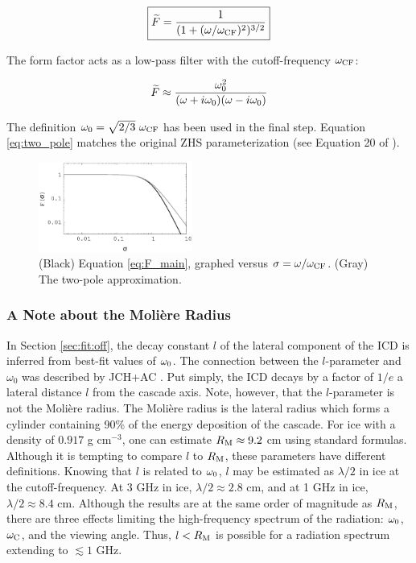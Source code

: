 \documentclass[amsmath,amssymb,aps,prd,10pt,twocolumn]{revtex4}
\begin{document}
\begin{equation}
\boxed{
\widetilde{F} = \frac{1}{(1+(\omega/\omega_{\rm CF})^2)^{3/2}}
} \label{eq:F_main}
\end{equation}

The form factor acts as a low-pass filter with the cutoff-frequency $\omega_{\rm CF}$:

\begin{equation}
\widetilde{F} \approx \frac{\omega_{\rm 0}^2}{(\omega+i\omega_{\rm 0})(\omega-i\omega_{\rm 0})} \label{eq:two_pole}
\end{equation}

The definition $\omega_{\rm 0} = \sqrt{2/3} ~ \omega_{\rm CF}$ has been used in the final step.  Equation \ref{eq:two_pole} matches the original ZHS parameterization (see Equation 20 of \cite{zhs}).

\begin{figure}
\centering
\includegraphics[width=0.45\textwidth]{April23_plot1.eps}
\caption{\label{fig:F}  (Black) Equation \ref{eq:F_main}, graphed versus $\sigma = \omega/\omega_{\rm CF}$. (Gray) The two-pole approximation.}
\end{figure}

\subsubsection{A Note about the Moli\`{e}re Radius}

In Section \ref{sec:fit:off}, the decay constant $l$ of the lateral component of the ICD is inferred from best-fit values of $\omega_{\rm 0}$.  The connection between the $l$-parameter and $\omega_0$ was described by JCH+AC \cite{10.1016/j.astropartphys.2017.03.008}.  Put simply, the ICD decays by a factor of $1/e$ a lateral distance $l$ from the cascade axis.  Note, however, that the $l$-parameter is not the Moli\`{e}re radius.  The Moli\`{e}re radius is the lateral radius which forms a cylinder containing 90\% of the energy deposition of the cascade.  For ice with a density of $0.917$ g cm$^{-3}$, one can estimate $R_{\rm M} \approx 9.2$ cm using standard formulas.  Although it is tempting to compare $l$ to $R_{\rm M}$, these parameters have different definitions. Knowing that $l$ is related to $\omega_{\rm 0}$, $l$ may be estimated as $\lambda/2$ in ice at the cutoff-frequency.  At 3 GHz in ice, $\lambda/2 \approx 2.8$ cm, and at 1 GHz in ice, $\lambda/2 \approx 8.4$ cm.  Although the results are at the same order of magnitude as $R_{\rm M}$, there are three effects limiting the high-frequency spectrum of the radiation: $\omega_{\rm 0}$, $\omega_{\rm C}$, and the viewing angle.  Thus, $l < R_{\rm M}$ is possible for a radiation spectrum extending to $\lesssim 1$ GHz.  
\end{document}
